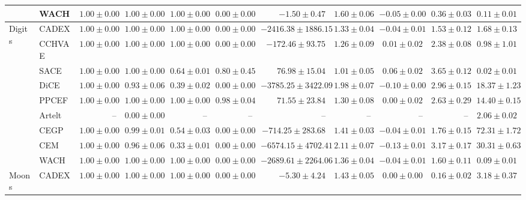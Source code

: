 \begin{table}[ht]
\begin{center}
\begin{sc}
\begin{scriptsize}
\begin{tabular}{l|l|rrrrrrrrr}
 & WACH & $\boldsymbol{1.00\pm{0.00}}$ & $\boldsymbol{1.00\pm{0.00}}$ & $\boldsymbol{1.00\pm{0.00}}$ & $0.00\pm{0.00}$ & $-1.50\pm{0.47}$ & $1.60\pm{0.06}$ & $-0.05\pm{0.00}$ & $0.36\pm{0.03}$ & $0.11\pm{0.01}$ \\
\midrule
\multirow{9}{*}{Digits} & CADEX & $\boldsymbol{1.00\pm{0.00}}$ & $\boldsymbol{1.00\pm{0.00}}$ & $\boldsymbol{1.00\pm{0.00}}$ & $0.00\pm{0.00}$ & $-2416.38\pm{1886.15}$ & $1.33\pm{0.04}$ & $-0.04\pm{0.01}$ & $\boldsymbol{1.53\pm{0.12}}$ & $1.68\pm{0.13}$ \\
 & CCHVAE & $\boldsymbol{1.00\pm{0.00}}$ & $\boldsymbol{1.00\pm{0.00}}$ & $\boldsymbol{1.00\pm{0.00}}$ & $0.00\pm{0.00}$ & $-172.46\pm{93.75}$ & $1.26\pm{0.09}$ & $0.01\pm{0.02}$ & $2.38\pm{0.08}$ & $0.98\pm{1.01}$ \\
 & SACE & $\boldsymbol{1.00\pm{0.00}}$ & $\boldsymbol{1.00\pm{0.00}}$ & $0.64\pm{0.01}$ & $0.80\pm{0.45}$ & $\boldsymbol{76.98\pm{15.04}}$ & $\boldsymbol{1.01\pm{0.05}}$ & $0.06\pm{0.02}$ & $3.65\pm{0.12}$ & $\boldsymbol{0.02\pm{0.01}}$ \\
 & DiCE & $\boldsymbol{1.00\pm{0.00}}$ & $0.93\pm{0.06}$ & $0.39\pm{0.02}$ & $0.00\pm{0.00}$ & $-3785.25\pm{3422.09}$ & $1.98\pm{0.07}$ & $-0.10\pm{0.00}$ & $2.96\pm{0.15}$ & $18.37\pm{1.23}$ \\
 & PPCEF & $\boldsymbol{1.00\pm{0.00}}$ & $\boldsymbol{1.00\pm{0.00}}$ & $\boldsymbol{1.00\pm{0.00}}$ & $\boldsymbol{0.98\pm{0.04}}$ & $71.55\pm{23.84}$ & $1.30\pm{0.08}$ & $0.00\pm{0.02}$ & $2.63\pm{0.29}$ & $14.40\pm{0.15}$ \\
 & Artelt & -- & $0.00\pm0.00$ & -- & -- & -- & -- & -- & -- & $2.06\pm0.02$ \\
 & CEGP & $\boldsymbol{1.00\pm{0.00}}$ & $0.99\pm{0.01}$ & $0.54\pm{0.03}$ & $0.00\pm{0.00}$ & $-714.25\pm{283.68}$ & $1.41\pm{0.03}$ & $-0.04\pm{0.01}$ & $1.76\pm{0.15}$ & $72.31\pm{1.72}$ \\
 & CEM & $\boldsymbol{1.00\pm{0.00}}$ & $0.96\pm{0.06}$ & $0.33\pm{0.01}$ & $0.00\pm{0.00}$ & $-6574.15\pm{4702.41}$ & $2.11\pm{0.07}$ & $-0.13\pm{0.01}$ & $3.17\pm{0.17}$ & $30.31\pm{0.63}$ \\
 & WACH & $\boldsymbol{1.00\pm{0.00}}$ & $\boldsymbol{1.00\pm{0.00}}$ & $\boldsymbol{1.00\pm{0.00}}$ & $0.00\pm{0.00}$ & $-2689.61\pm{2264.06}$ & $1.36\pm{0.04}$ & $-0.04\pm{0.01}$ & $1.60\pm{0.11}$ & $0.09\pm{0.01}$ \\
\midrule
\multirow{9}{*}{Moons} & CADEX & $\boldsymbol{1.00\pm{0.00}}$ & $\boldsymbol{1.00\pm{0.00}}$ & $\boldsymbol{1.00\pm{0.00}}$ & $0.00\pm{0.00}$ & $-5.30\pm{4.24}$ & $1.43\pm{0.05}$ & $0.00\pm{0.00}$ & $\boldsymbol{0.16\pm{0.02}}$ & $3.18\pm{0.37}$ \\

\end{tabular}
\end{scriptsize}
\end{sc}
\end{center}
\end{table}
